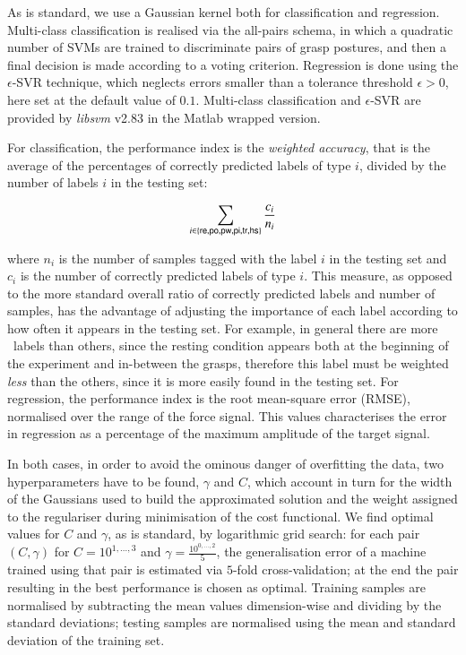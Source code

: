 As is standard, we use a Gaussian kernel both for classification and regression.
Multi-class classification is realised via the all-pairs schema,
in which a quadratic number of SVMs are trained to discriminate pairs of grasp
postures, and then a final decision is made according to a voting criterion.
Regression is done using the $\epsilon$-SVR technique, which neglects errors smaller
than a tolerance threshold $\epsilon>0$, here set at the default value of $0.1$.
Multi-class classification and $\epsilon$-SVR are
provided by \emph{libsvm} v2.83 \cite{ChangL01} in the Matlab wrapped version.

For classification, the performance index is the \emph{weighted accuracy},
that is the average of the percentages of correctly predicted labels of type
$i$, divided by the number of labels $i$ in the testing set:

$$ \sum_{i \in \{\textsf{re},\textsf{po},\textsf{pw},\textsf{pi},\textsf{tr},\textsf{hs}\}}	\frac{c_i}{n_i} $$

\noindent where $n_i$ is the number of samples tagged with the label $i$
in the testing set and $c_i$ is the number of correctly predicted labels of type $i$.
This measure, as opposed to the more standard overall ratio of correctly
predicted labels and number of samples, has the advantage of adjusting the
importance of each label according to how often it appears in the
testing set. For example, in general there are more \re\ labels than others,
since the resting condition appears both at the beginning
of the experiment and in-between the grasps, therefore this label must be
weighted \emph{less} than the others, since it is more easily found in the testing
set. For regression, the performance index is the root mean-square error (RMSE),
normalised over the range of the force signal. This values characterises
the error in regression as a percentage of the maximum amplitude of the target
signal.

In both cases, in order to avoid the ominous danger of overfitting the data,
two hyperparameters have to be found, $\gamma$ and $C$,
which account in turn for the width of the Gaussians used to build the
approximated solution and the weight assigned to the regulariser during minimisation of
the cost functional.
We find optimal values for $C$ and $\gamma$, as is standard, by logarithmic grid search:
for each pair $(C,\gamma)$ for $C=10^{1,\ldots,3}$ and $\gamma=\frac{10^{0,\ldots,2}}{5}$,
the generalisation error of a machine trained using that pair is estimated
via $5$-fold cross-validation; at the end the pair resulting in the best performance is
chosen as optimal. Training samples are normalised by subtracting the mean values
dimension-wise and dividing by the standard deviations; testing samples are normalised
using the mean and standard deviation of the training set.

